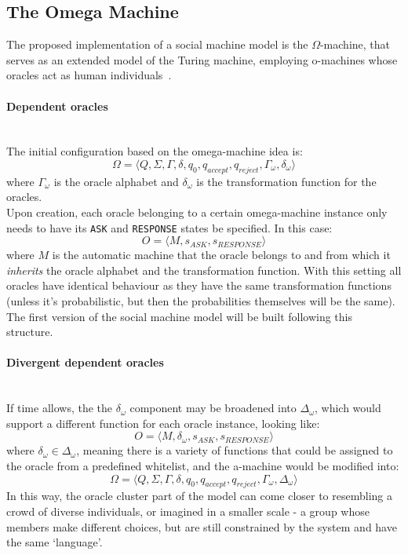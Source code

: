 \documentclass[12pt]{article}
\begin{document}
	\subsection{The Omega Machine}\label{sec:omega}
		The proposed implementation of a social machine model is the $\Omega$-machine, that serves as an extended model of the Turing machine, employing o-machines whose oracles act as human individuals~\cite{Zhang2014}.
		\paragraph{Dependent oracles}\hfill\\
			The initial configuration based on the omega-machine idea is:
			\[\Omega = \langle Q, \Sigma, \Gamma, \delta, q_{0}, q_{accept}, q_{reject},\Gamma_{\omega} ,\delta_{\omega}\rangle\] 
			where $\Gamma_{\omega}$ is the oracle alphabet and $\delta_{\omega}$ is the transformation function for the oracles. \\
			Upon creation, each oracle belonging to a certain omega-machine instance only needs to have its \texttt{ASK} and \texttt{RESPONSE} states be specified. In this case: 
			\[O = \langle M, s_{ASK}, s_{RESPONSE} \rangle\] 
			where $ M $ is the automatic machine that the oracle belongs to and from which it \textit{inherits} the oracle alphabet and the transformation function. 
			With this setting all oracles have identical behaviour as they have the same transformation functions (unless it's probabilistic, but then the probabilities themselves will be the same).
			The first version of the social machine model will be built following this structure.
		
		\paragraph{Divergent dependent oracles}\hfill\\
			If time allows, the the $\delta_{\omega}$ component may be broadened into $\Delta_{\omega}$, which would support a different function for each oracle instance, looking like: 
			\[O = \langle M, \delta_{\omega}, s_{ASK}, s_{RESPONSE} \rangle\] 
			where $\delta_{\omega} \in \Delta_{\omega}$, meaning there is a variety of functions that could be assigned to the oracle from a predefined whitelist, and the a-machine would be modified into:
			 \[\Omega = \langle Q, \Sigma, \Gamma, \delta, q_{0}, q_{accept}, q_{reject},\Gamma_{\omega} ,\Delta_{\omega}\rangle\]
			In this way, the oracle cluster part of the model can come closer to resembling a crowd of diverse individuals, or imagined in a smaller scale - a group whose members make different choices, but are still constrained by the system and have the same `language'.
		
\end{document}
